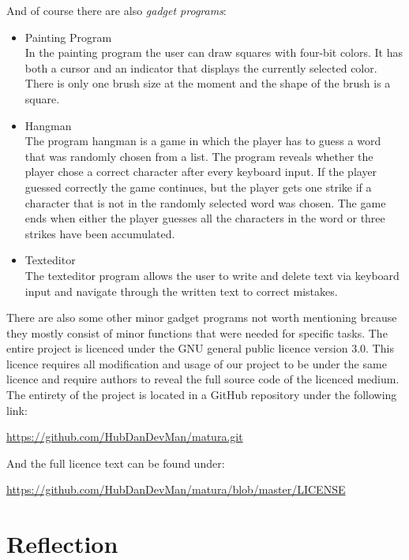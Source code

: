 \documentclass{article}
\begin{document}
And of course there are also \textit{gadget programs}:

\begin{itemize}

\item Painting Program \\
In the painting program the user can draw squares with four-bit colors. It has both a cursor and an indicator 
that displays the currently selected color. There is only one brush size at the moment and the
shape of the brush is a square.

\item Hangman \\
The program hangman is a game in which the player has to guess a word that was randomly chosen from a list. The program 
reveals whether the player chose a correct character after every keyboard input. If the player guessed correctly
the game continues, but the player gets one strike if a character that is not in the randomly selected word 
was chosen. The game ends when either the player guesses all the characters in the word or three strikes have
been accumulated.

\item Texteditor \\
The texteditor program allows the user to write and delete text via keyboard input and navigate through the written 
text to correct mistakes.

\end{itemize}



There are also some other minor gadget programs not worth mentioning brcause they mostly consist of minor functions 
that were needed for specific tasks. The entire project is licenced under the GNU general public licence version 
3.0. This licence requires all modification and usage of our project to be under the same licence and 
require authors to reveal the full source code of the licenced medium. The entirety of the project is located
in a GitHub repository under the following link:

\url{https://github.com/HubDanDevMan/matura.git}

And the full licence text can be found under:

\url{https://github.com/HubDanDevMan/matura/blob/master/LICENSE}

\section{Reflection}
\end{document}
